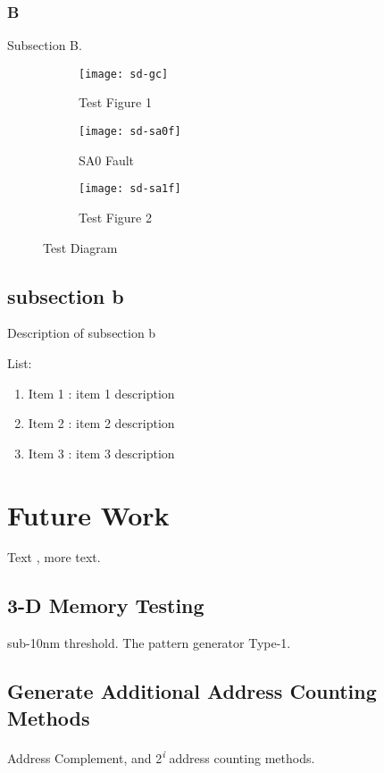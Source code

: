 \subsubsection{B} 
Subsection B.
\begin{figure}[H]
  \centering
  \begin{subfigure}[b]{0.5\textwidth}
    \texttt{[image: sd-gc]}
    \caption{Test Figure 1}
    \label{fig:sd-gc}
  \end{subfigure}  
  
  \begin{subfigure}[b]{0.25\textwidth}
    \texttt{[image: sd-sa0f]}
    \caption{SA0 Fault}
    \label{fig:sd-sa0f}
  \end{subfigure}  
  \begin{subfigure}[b]{0.25\textwidth}
    \texttt{[image: sd-sa1f]}
    \caption{Test Figure 2}
    \label{fig:sd-sa1f}
  \end{subfigure}  

  \caption[Test Diagram]{Test Diagram \cite{VanDeGoor1991}}
  \label{fig:sd-sc}
\end{figure}

\subsection{subsection b}
Description of subsection b

List:
\begin{enumerate}
  \item Item 1 \cite{1584083}: item 1 description
  \item Item 2 \cite{NovelBist}: item 2 description
  \item Item 3 \cite{VanDeGoor1991}: item 3 description
\end{enumerate}

\section{Future Work}
\label{sect:bg-future}
Text \cite{1584083}, more text.

\subsection{3-D Memory Testing}
sub-10nm threshold.  The pattern generator Type-1.

\subsection{Generate Additional Address Counting Methods}
Address Complement, and 2\textsuperscript{\textit{i}} address counting methods.  
